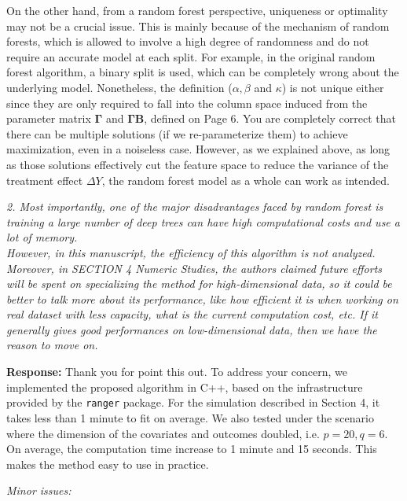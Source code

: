 \documentclass[11pt]{article}
\begin{document}
On the other hand, from a random forest perspective, uniqueness or optimality may not be a crucial issue. This is mainly because of the mechanism of random forests, which is allowed to involve a high degree of randomness and do not require an accurate model at each split. For example, in the original random forest algorithm, a binary split is used, which can be completely wrong about the underlying model. Nonetheless, the definition ($\alpha, \beta$ and $\kappa$) is not unique either since they are only required to fall into the column space induced from the parameter matrix $\boldsymbol\Gamma$ and $\boldsymbol\Gamma\mathbf{B}$, defined on Page 6. You are completely correct that there can be multiple solutions (if we re-parameterize them) to achieve maximization, even in a noiseless case. However, as we explained above, as long as those solutions effectively cut the feature space to reduce the variance of the treatment effect $\Delta Y$, the random forest model as a whole can work as intended.  

\bigskip

{\em 2. Most importantly, one of the major disadvantages faced by random forest is training a large number of deep trees can have high computational costs and use a lot of memory.\\
However, in this manuscript, the efficiency of this algorithm is not analyzed. Moreover, in SECTION 4 Numeric Studies, the authors claimed future efforts will be spent on specializing the method for high-dimensional data, so it could be better to talk more about its performance, like how efficient it is when working on real dataset with less capacity, what is the current computation cost, etc. If it generally gives good performances on low-dimensional data, then we have the reason to move on.}

\medskip

\textbf{Response:} Thank you for point this out. To address your concern, we implemented the proposed algorithm in C++, based on the infrastructure provided by the \texttt{ranger}\citep{wright2015ranger} package. For the simulation described in Section 4, it takes less than 1 minute to fit on average. We also tested under the scenario where the dimension of the covariates and outcomes doubled, i.e. $p=20, q=6$. On average, the computation time increase to 1 minute and 15 seconds. This makes the method easy to use in practice. 

\bigskip

{\em Minor issues:}\\
\end{document}
